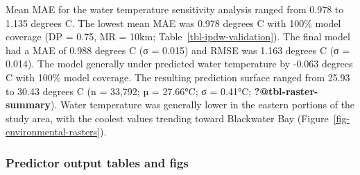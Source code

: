 \documentclass[
  review]{elsarticle}
\begin{document}
Mean MAE for the water temperature sensitivity analysis ranged from
0.978 to 1.135 degrees C. The lowest mean MAE was 0.978 degrees C with
100\% model coverage (DP = 0.75, MR = 10km;
Table~\ref{tbl-ipdw-validation}). The final model had a MAE of 0.988
degrees C (σ = 0.015) and RMSE was 1.163 degrees C (σ = 0.014). The
model generally under predicted water temperature by -0.063 degrees C
with 100\% model coverage. The resulting prediction surface ranged from
25.93 to 30.43 degrees C (n = 33,792; µ = 27.66°C; σ = 0.41°C;
\textbf{?@tbl-raster-summary}). Water temperature was generally lower in
the eastern portions of the study area, with the coolest values trending
toward Blackwater Bay (Figure~\ref{fig-environmental-rasters}).

\subsubsection{Predictor output tables and
figs}\label{predictor-output-tables-and-figs}
\end{document}
